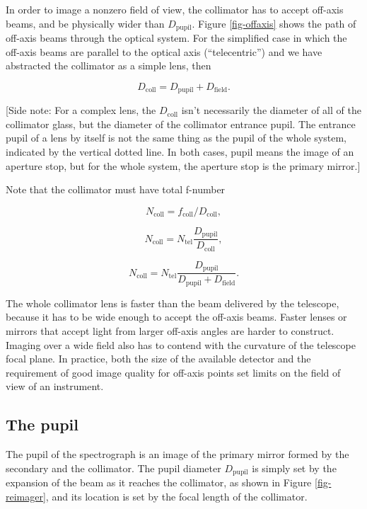 \documentclass[12pt]{article}
\begin{document}
In order to image a nonzero field of view, the collimator
has to accept off-axis beams, and be physically wider than
$D_{\mathrm{pupil}}$.  Figure \ref{fig-offaxis} shows the path of off-axis
beams through the optical system.
For the simplified case in which 
the off-axis beams are parallel to the optical
axis (``telecentric'') and we have abstracted the collimator
as a simple lens, then

$$ D_{\mathrm{coll}} = D_{\mathrm{pupil}} + D_{\mathrm{field}}. $$

[Side note: For a complex lens, the $D_{\mathrm{coll}}$ isn't necessarily the diameter 
of all of the collimator glass, but the diameter of the 
collimator entrance pupil.  The entrance pupil of a lens by itself
is not the same thing as the pupil of the whole system,
indicated by the vertical dotted line.  In both cases, pupil means
the image of an aperture stop, but for the whole system, the aperture
stop is the primary mirror.]

Note that the collimator must have total f-number

$$ N_{\mathrm{coll}} = f_{\mathrm{coll}} / D_{\mathrm{coll}}, $$

$$ N_{\mathrm{coll}} = N_{\mathrm{tel}} \frac{D_{\mathrm{pupil}}}{D_{\mathrm{coll}}}, $$

$$ N_{\mathrm{coll}} = N_{\mathrm{tel}} \frac{D_{\mathrm{pupil}}}{D_{\mathrm{pupil}}+D_{\mathrm{field}}}. $$

The whole collimator lens is faster than the beam delivered 
by the telescope, because it has to be wide enough to accept 
the off-axis beams.  Faster lenses or mirrors
that accept light from larger off-axis angles are harder to
construct.  Imaging over a wide field also has to contend with the
curvature of the telescope focal plane.  In practice, both the
size of the available detector and the requirement of good image 
quality for off-axis points set limits on the field of view of an 
instrument.

\subsection{The pupil}

The pupil of the spectrograph is an image of the primary
mirror formed by the secondary and the collimator.
The pupil diameter $D_{\mathrm{pupil}}$ is simply set by the expansion
of the beam as it reaches the collimator, as shown in 
Figure \ref{fig-reimager}, and its location is set by 
the focal length of the collimator.
\end{document}
